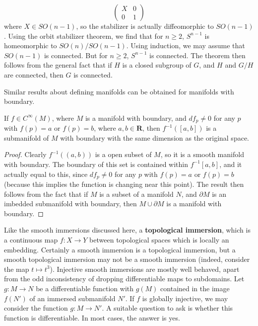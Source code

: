 \begin{example}
    \[ \begin{pmatrix} X & 0 \\ 0 & 1 \end{pmatrix} \]
    where $X \in SO(n-1)$, so the stabilizer is actually diffeomorphic to $SO(n-1)$. Using the orbit stabilizer theorem, we find that for $n \geq 2$, $S^{n-1}$ is homeomorphic to $SO(n)/SO(n-1)$. Using induction, we may assume that $SO(n-1)$ is connected. But for $n \geq 2$, $S^{n-1}$ is connected. The theorem then follows from the general fact that if $H$ is a closed subgroup of $G$, and $H$ and $G/H$ are connected, then $G$ is connected.
\end{example}

Similar results about defining manifolds can be obtained for manifolds with boundary.

\begin{theorem}
    If $f \in C^\infty(M)$, where $M$ is a manifold with boundary, and $df_p \neq 0$ for any $p$ with $f(p) = a$ or $f(p) = b$, where $a,b \in \mathbf{R}$, then $f^{-1}([a,b])$ is a submanifold of $M$ with boundary with the same dimension as the original space.
\end{theorem}
\begin{proof}
    Clearly $f^{-1}((a,b))$ is a open subset of $M$, so it is a smooth manifold with boundary. The boundary of this set is contained within $f^{-1}[a,b]$, and it actually equal to this, since $df_p \neq 0$ for any $p$ with $f(p) = a$ or $f(p) = b$ (because this implies the function is changing near this point). The result then follows from the fact that if $M$ is a subset of a manifold $N$, and $\partial M$ is an imbedded submanifold with boundary, then $M \cup \partial M$ is a manifold with boundary.
\end{proof}

Like the smooth immersions discussed here, a {\bf topological immersion}, which is a continuous map $f: X \to Y$ between topological spaces which is locally an embedding. Certainly a smooth immersion is a topological immersion, but a smooth topological immersion may not be a smooth immersion (indeed, consider the map $t \mapsto t^3$). Injective smooth immersions are mostly well behaved, apart from the odd inconsistency of dropping differentiable maps to subdomains. Let $g:M \to N$ be a differentiable function with $g(M)$ contained in the image $f(N')$ of an immersed submanifold $N'$. If $f$ is globally injective, we may consider the function $g:M \to N'$. A suitable question to ask is whether this function is differentiable. In most cases, the answer is yes.

